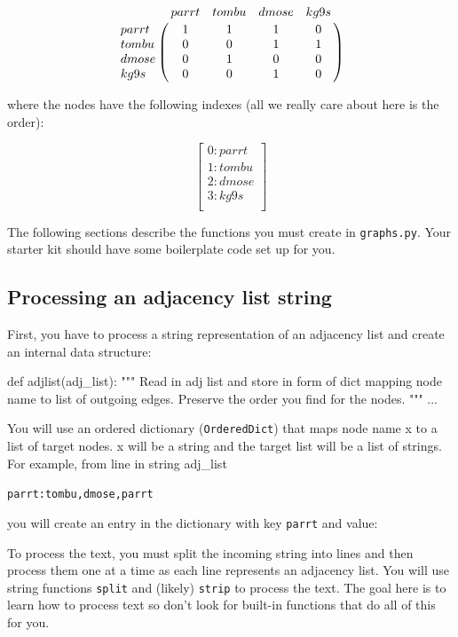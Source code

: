 \begin{fullwidth}
\[
\bordermatrix{
~ & parrt & tombu & dmose & kg9s \cr
parrt & 1 & 1 & 1 & 0\cr
tombu & 0 & 0 & 1 & 1 \cr
dmose & 0 & 1 & 0 & 0 \cr
kg9s & 0 & 0 & 1 & 0\cr
}
\]

\noindent where the nodes have the following indexes (all we really care about here is the order):
 
\[
\left[
\begin{array}{c}
0: parrt \\
1: tombu \\
2: dmose \\
3: kg9s \\
\end{array}
\right]
\]

The following sections describe the functions you must create in {\tt graphs.py}. Your starter kit should have some boilerplate code set up for you.

\subsection{Processing an adjacency list string}

First, you have to process a string representation of an adjacency list and create an internal data structure:

\begin{pyverbatim}
def adjlist(adj_list):
    """
    Read in adj list and store in form of dict mapping node
    name to list of outgoing edges. Preserve the order you find
    for the nodes.
    """
    ...
\end{pyverbatim}

You will use an ordered dictionary ({\tt OrderedDict}) that maps node name x to a list of target nodes. x will be a string and the target list will be a list of strings. For example, from line in string adj\_list

\begin{alltt}
parrt: tombu, dmose, parrt
\end{alltt}

\noindent you will create an entry in the dictionary with key {\tt parrt} and value:

\begin{pyverbatim}
\end{pyverbatim}

\noindent To process the text, you must split the incoming string into lines and then process them one at a time as each line represents an adjacency list. You will use string functions {\tt split} and (likely) {\tt strip} to process the text. The goal here is to learn how to process text so don't look for built-in functions that do all of this for you.


\end{fullwidth}
